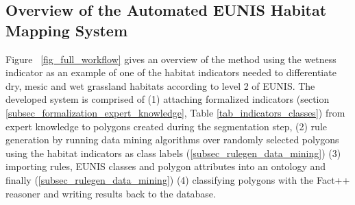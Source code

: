 \documentclass[authoryear, review,12pt,number]{elsarticle}
\begin{document}
\label{subsec_method_overview}
\subsection{Overview of the Automated EUNIS Habitat Mapping System}
Figure ~\ref{fig_full_workflow} gives an overview of the method using the
wetness indicator as an example of one of the habitat indicators needed to
differentiate dry, mesic and wet grassland habitats according to level 2 of
EUNIS. The developed system is comprised of (1) attaching formalized indicators
(section \ref{subsec_formalization_expert_knowledge}, Table
\ref{tab_indicators_classes}) from expert knowledge to polygons created during
the segmentation step, (2) rule generation by running data mining algorithms
over randomly selected polygons using the habitat indicators as class labels
(\ref{subsec_rulegen_data_mining})
(3) importing rules, EUNIS classes
and polygon attributes into an ontology and finally
(\ref{subsec_rulegen_data_mining}) (4) classifying polygons
with the Fact++ reasoner \citep{Tsarkov2006} and writing results back to the
database. 
\end{document}
